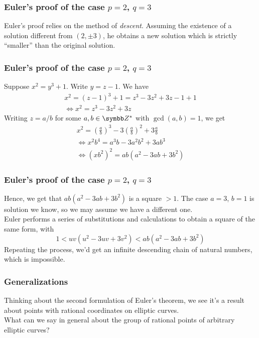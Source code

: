 \begin{frame}
\frametitle{Euler's proof of the case \texorpdfstring{\(p = 2\), \(q = 3\)}{p = 2, q = 3}}

Euler's proof \cite{Euler1914} relies on the method of \emph{descent}. Assuming the existence of a solution different from \((2, \pm 3)\), he obtains a new solution which is strictly ``smaller'' than the original solution.
\end{frame}

\begin{frame}
\frametitle{Euler's proof of the case \texorpdfstring{\(p = 2\), \(q = 3\)}{p = 2, q = 3}}

Suppose \(x^2 = y^3 + 1\). Write \(y = z - 1\). We have
\begin{gather*}
    x^2 = (z - 1)^3 + 1 = z^3 - 3 z^2 + 3 z - 1 + 1 \\
    \iff
    x^2 = z^3 - 3 z^2 + 3 z
\end{gather*}
Writing \(z = a/b\) for some \(a, b \in \integers^*\) with \(\gcd(a, b) = 1\), we get
\begin{gather*}
    x^2 = \left(\frac{a}{b}\right)^3 - 3 \left(\frac{a}{b}\right)^2 + 3 \frac{a}{b} \\[0.5em]
    \iff x^2 b^4 = a^3 b - 3 a^2 b^2 + 3 a b^3 \\[0.4em]
    \iff \left(x b^2\right)^2 = ab (a^2 - 3 a b + 3 b^2)
\end{gather*}
\end{frame}

\begin{frame}
\frametitle{Euler's proof of the case \texorpdfstring{\(p = 2\), \(q = 3\)}{p = 2, q = 3}}

Hence, we get that \(ab (a^2 - 3 a b + 3 b^2)\) is a square \(> 1\). The case \(a = 3\), \(b = 1\) is solution we know, so we may assume we have a different one. \\[1em]

Euler performs a series of substitutions and calculations to obtain a square of the same form, with
\[
    1 < u v (u^2 - 3 u v + 3 v^2) < ab(a^2 - 3ab + 3b^2)
\]
Repeating the process, we'd get an infinite descending chain of natural numbers, which is impossible.
\end{frame}

\begin{frame}
\frametitle{Generalizations}

Thinking about the second formulation of Euler's theorem, we see it's a result about points with rational coordinates on elliptic curves. \\[1em]

What can we say in general about the group of rational points of arbitrary elliptic curves?
\end{frame}

